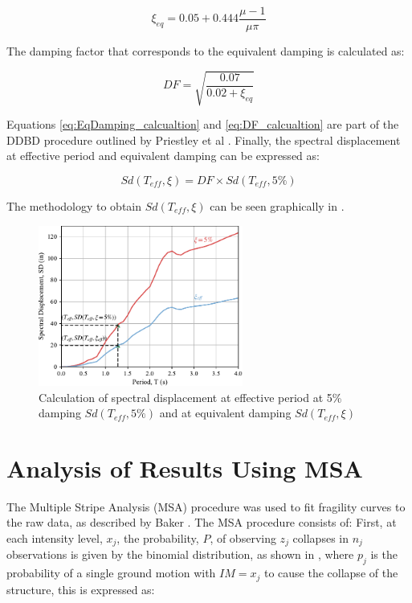 \begin{equation}
    \xi_{eq}=0.05+0.444\frac{\mu-1}{\mu\pi}
    \label{eq:EqDamping_calcualtion}
\end{equation}

The damping factor that corresponds to the equivalent damping is calculated as:

\begin{equation}
    DF=\sqrt{\frac{0.07}{0.02+\xi_{eq}}}
    \label{eq:DF_calcualtion}
\end{equation}

Equations \ref{eq:EqDamping_calcualtion} and \ref{eq:DF_calcualtion} are part of the DDBD procedure outlined by Priestley et al \cite{Priestley2007}. Finally, the spectral displacement at effective period and equivalent damping can be expressed as:

\begin{equation}
    Sd(T_{eff},\xi)=DF \times Sd(T_{eff},5\%)
    \label{eq:Sd_teff_xi_calcualtion}
\end{equation}

The methodology to obtain $Sd(T_{eff},\xi)$  can be seen graphically in .

\begin{figure}[htbp]
	\centering
	\includegraphics[width=0.6\textwidth]{VAC Thesis 2.0/Chapter-5/figs/SpectralDisplacement_SD(Teff,xi)_Calc.pdf}
	\caption{Calculation of spectral displacement at effective period at 5\% damping $Sd(T_{eff},5\%)$ and at equivalent damping $Sd(T_{eff},\xi)$}
	\label{fig:SpectralDisplacementCalculation}
\end{figure}

\section{Analysis of Results Using MSA}

The Multiple Stripe Analysis (MSA) procedure was used to fit fragility curves to the raw data, as described by Baker \cite{Baker2015}. The MSA procedure consists of: First, at each intensity level, $x_j$, the probability, $P$, of observing $z_j$ collapses in $n_j$ observations is given by the binomial distribution, as shown in , where $p_j$ is the probability of a single ground motion with $IM = x_j$ to cause the collapse of the structure, this is expressed as:

